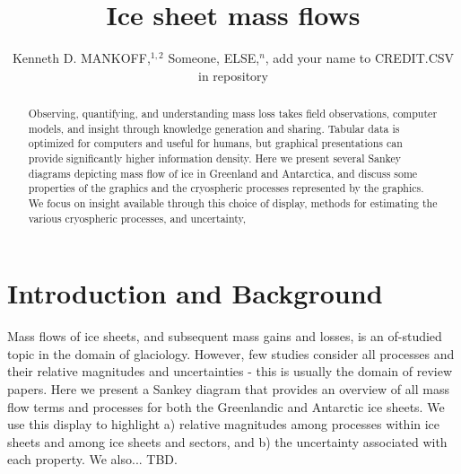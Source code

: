 \documentclass[review,jog]{igs}
\begin{document}
\title[Sankey mass flows]{Ice sheet mass flows}

\author[Mankoff and others]
       {Kenneth D. MANKOFF,$^{1,2}$
         Someone, ELSE,$^n$,
       add your name to CREDIT.CSV in repository}


\begin{frontmatter}
\maketitle
\begin{abstract}

  Observing, quantifying, and understanding mass loss takes field observations, computer models, and insight through knowledge generation and sharing. Tabular data is optimized for computers and useful for humans, but graphical presentations can provide significantly higher information density. Here we present several Sankey diagrams depicting mass flow of ice in Greenland and Antarctica, and discuss some properties of the graphics and the cryospheric processes represented by the graphics. We focus on insight available through this choice of display, methods for estimating the various cryospheric processes, and uncertainty,
\end{abstract}
\end{frontmatter}

\section{Introduction and Background}

Mass flows of ice sheets, and subsequent mass gains and losses, is an of-studied topic in the domain of glaciology. However, few studies consider all processes and their relative magnitudes and uncertainties - this is usually the domain of review papers. Here we present a Sankey diagram that provides an overview of all mass flow terms and processes for both the Greenlandic and Antarctic ice sheets. We use this display to highlight a) relative magnitudes among processes within ice sheets and among ice sheets and sectors, and b) the uncertainty associated with each property. We also... TBD.
\end{document}
